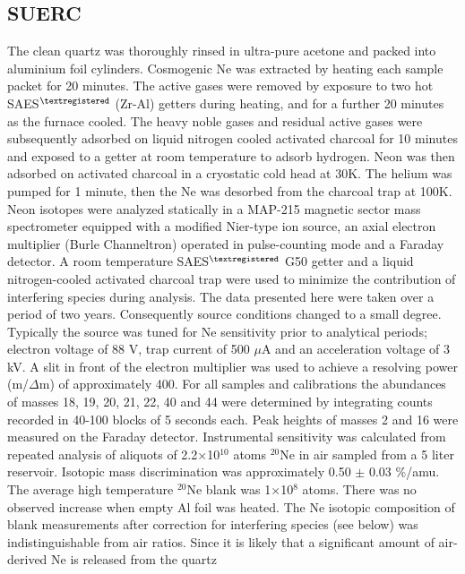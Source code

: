 \documentclass[authoryear,review,12pt]{elsarticle}
\begin{document}
\subsection{SUERC}

The clean quartz was thoroughly rinsed in ultra-pure acetone and
packed into aluminium foil cylinders.  Cosmogenic Ne was extracted by
heating each sample packet for 20 minutes. The active gases were
removed by exposure to two hot SAES$^{\tiny\textregistered}$ (Zr-Al)
getters during heating, and for a further 20 minutes as the furnace
cooled. The heavy noble gases and residual active gases were
subsequently adsorbed on liquid nitrogen cooled activated charcoal for
10 minutes and exposed to a getter at room temperature to adsorb
hydrogen. Neon was then adsorbed on activated charcoal in a cryostatic
cold head at 30K. The helium was pumped for 1 minute, then the Ne was
desorbed from the charcoal trap at 100K.  Neon isotopes were analyzed
statically in a MAP-215 magnetic sector mass spectrometer equipped
with a modified Nier-type ion source, an axial electron multiplier
(Burle Channeltron) operated in pulse-counting mode and a Faraday
detector. A room temperature SAES$^{\tiny\textregistered}$ G50 getter
and a liquid nitrogen-cooled activated charcoal trap were used to
minimize the contribution of interfering species during analysis. The
data presented here were taken over a period of two
years. Consequently source conditions changed to a small
degree. Typically the source was tuned for Ne sensitivity prior to
analytical periods; electron voltage of 88 V, trap current of 500
$\mu$A and an acceleration voltage of 3 kV. A slit in front of the
electron multiplier was used to achieve a resolving power
(m/$\Delta$m) of approximately 400. For all samples and calibrations
the abundances of masses 18, 19, 20, 21, 22, 40 and 44 were determined
by integrating counts recorded in 40-100 blocks of 5 seconds
each. Peak heights of masses 2 and 16 were measured on the Faraday
detector.  Instrumental sensitivity was calculated from repeated
analysis of aliquots of 2.2$\times$10$^{10}$ atoms $^{20}$Ne in air
sampled from a 5 liter reservoir. Isotopic mass discrimination was
approximately 0.50 $\pm$ 0.03 \%/amu. The average high temperature
$^{20}$Ne blank was 1$\times$10$^8$ atoms. There was no observed
increase when empty Al foil was heated. The Ne isotopic composition of
blank measurements after correction for interfering species (see
below) was indistinguishable from air ratios. Since it is likely that
a significant amount of air-derived Ne is released from the quartz
\end{document}
